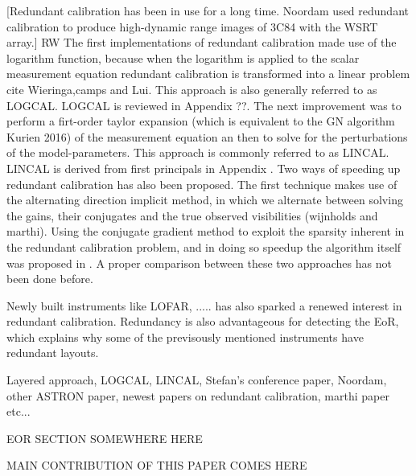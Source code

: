 \documentclass[useAMS,usenatbib]{mn2e}
\begin{document}
[Redundant calibration has been in use for a long time. Noordam used redundant calibration to produce high-dynamic range images of 3C84 with the 
WSRT array.] RW The first implementations of redundant calibration made use of the logarithm function, because when the logarithm is applied to the scalar measurement equation redundant 
calibration is transformed into a linear problem cite Wieringa,camps and Lui. This approach is also generally referred to as LOGCAL.
LOGCAL is reviewed in Appendix ??. The next improvement was to perform a firt-order taylor expansion (which is equivalent to the GN algorithm Kurien 2016) of the measurement equation an then to solve for the
perturbations of the model-parameters. This approach is commonly referred to as LINCAL. LINCAL is derived from first principals in Appendix . Two ways of speeding up redundant calibration has also been 
proposed. The first technique makes use of the alternating direction implicit method, in which we alternate between solving the gains, their conjugates and 
the true observed visibilities (wijnholds and marthi). Using the conjugate gradient method to exploit the sparsity inherent in the redundant calibration problem, 
and in doing so speedup the algorithm itself was proposed in . A proper comparison between these two approaches has not been done before.

Newly built instruments like LOFAR, ..... has also sparked a renewed interest in redundant calibration. Redundancy is also advantageous for detecting the EoR,
which explains why some of the previsously mentioned instruments have redundant layouts.

Layered approach, LOGCAL, LINCAL, Stefan's conference paper, Noordam, other ASTRON paper, newest papers on redundant calibration, marthi paper etc...

EOR SECTION SOMEWHERE HERE

MAIN CONTRIBUTION OF THIS PAPER COMES HERE
\end{document}
